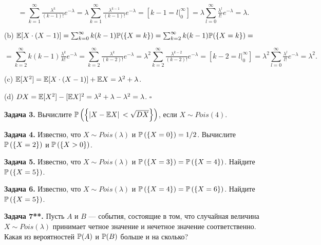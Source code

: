 \[=\sum _{k=1}^{\infty }{\tfrac{\lambda ^{k} }{(k-1)!}} e^{-\lambda }  =\lambda \sum _{k=1}^{\infty }{\tfrac{\lambda ^{k-1} }{(k-1)!}} e^{-\lambda }  =[k-1=l|_{0}^{\infty } ]=\lambda \sum _{l=0}^{\infty }{\tfrac{\lambda ^{l} }{l!}} e^{-\lambda }  =\lambda .\] 

(b) ${\rm {\mathbb E}}[X\cdot (X-1)]=\sum _{k=0}^{\infty }k(k-1){\rm {\mathbb P}}(\{ X=k\} ) =\sum _{k=2}^{\infty }k(k-1){\rm {\mathbb P}}(\{ X=k\} ) =$

\[=\sum _{k=2}^{\infty }k(k-1){\tfrac{\lambda ^{k} }{k!}} e^{-\lambda }  =\sum _{k=2}^{\infty }{\tfrac{\lambda ^{k} }{(k-2)!}} e^{-\lambda }  =\lambda ^{2} \sum _{k=2}^{\infty }{\tfrac{\lambda ^{k-2} }{(k-2)!}} e^{-\lambda }  =[k-2=l|_{0}^{\infty } ]=\lambda ^{2} \sum _{l=0}^{\infty }{\tfrac{\lambda ^{l} }{l!}} e^{-\lambda }  =\lambda ^{2} .\] 

(c) ${\rm {\mathbb E}}[X^{2} ]={\rm {\mathbb E}}[X\cdot (X-1)]+{\rm {\mathbb E}}X=\lambda ^{2} +\lambda $.

(d) $DX={\rm {\mathbb E}}[X^{2} ]-[{\rm {\mathbb E}}X]^{2} =\lambda ^{2} +\lambda -\lambda ^{2} =\lambda $. $\square $

\textbf{Задача 3.} Вычислите ${\rm {\mathbb P}}\left(\left\{|X-{\rm {\mathbb E}}X|\, <\sqrt{DX} \right\}\right)$, если $X\sim Pois(4)$.

\textbf{Задача 4.} Известно, что $X\sim Pois(\lambda )$ и ${\rm {\mathbb P}}\left(\left\{X=0\right\}\right)=1/2$. Вычислите ${\rm {\mathbb P}}\left(\left\{X=2\right\}\right)$ и ${\rm {\mathbb P}}\left(\left\{X>0\right\}\right)$.

\textbf{Задача 5.} Известно, что $X\sim Pois(\lambda )$ и ${\rm {\mathbb P}}\left(\left\{X=3\right\}\right)={\rm {\mathbb P}}\left(\left\{X=4\right\}\right)$. Найдите ${\rm {\mathbb P}}\left(\left\{X=5\right\}\right)$.

\textbf{Задача 6.} Известно, что $X\sim Pois(\lambda )$ и ${\rm {\mathbb P}}\left(\left\{X=4\right\}\right)={\rm {\mathbb P}}\left(\left\{X=6\right\}\right)$. Найдите ${\rm {\mathbb P}}\left(\left\{X=5\right\}\right)$.

\textbf{Задача 7**.} Пусть $A$ и $B$ --- события, состоящие в том, что случайная величина $X\sim Pois(\lambda )$ принимает четное значение и нечетное значение соответственно. Какая из вероятностей ${\rm {\mathbb P}}(A)$ и ${\rm {\mathbb P}}(B)$ больше и на сколько?

